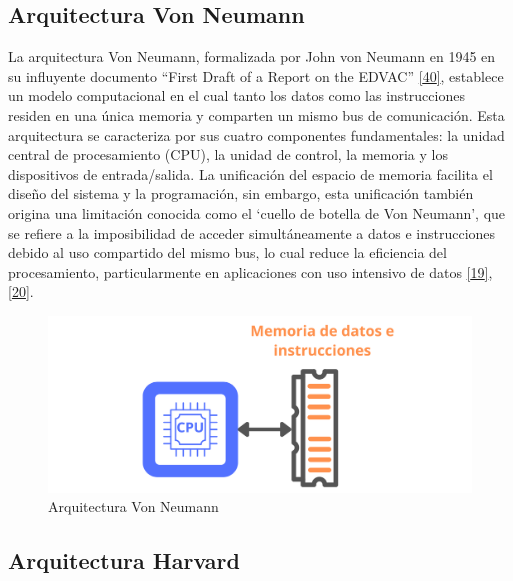 \documentclass[12pt,oneside]{templates/unerthesis}
\begin{document}
\hypertarget{arquitectura-von-neumann}{%
\subsection{Arquitectura Von Neumann}\label{arquitectura-von-neumann}}

La arquitectura Von Neumann, formalizada por John von Neumann en 1945 en su influyente documento ``First Draft of a Report on the EDVAC'' \protect\hyperlink{ref-vonneumann1945first}{{[}40{]}}, establece un modelo computacional en el cual tanto los datos como las instrucciones residen en una única memoria y comparten un mismo bus de comunicación. Esta arquitectura se caracteriza por sus cuatro componentes fundamentales: la unidad central de procesamiento (CPU), la unidad de control, la memoria y los dispositivos de entrada/salida. La unificación del espacio de memoria facilita el diseño del sistema y la programación, sin embargo, esta unificación también origina una limitación conocida como el `cuello de botella de Von Neumann', que se refiere a la imposibilidad de acceder simultáneamente a datos e instrucciones debido al uso compartido del mismo bus, lo cual reduce la eficiencia del procesamiento, particularmente en aplicaciones con uso intensivo de datos \protect\hyperlink{ref-hennessy2017computer}{{[}19{]}}, \protect\hyperlink{ref-stallings_computer_2021}{{[}20{]}}.

\begin{figure}

{\centering \includegraphics[width=0.85\linewidth]{images/vonneumann} 

}

\caption{Arquitectura Von Neumann}\label{fig:vonneumann}
\end{figure}

\hypertarget{arquitectura-harvard}{%
\subsection{Arquitectura Harvard}\label{arquitectura-harvard}}
\end{document}
